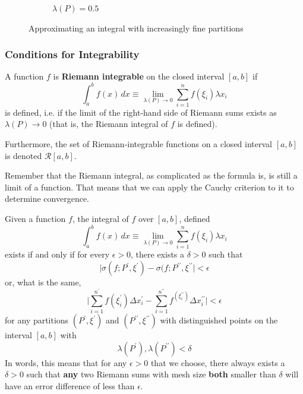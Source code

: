 \begin{definition}
\begin{figure}[H]
\begin{subfigure}[b]{0.32\textwidth}
        \caption{$\lambda(P) = 0.5$}
      \end{subfigure}
      \caption{Approximating an integral with increasingly fine partitions}
      \label{fig:partition-refinement}
    \end{figure}
  \end{definition}

\subsubsection{Conditions for Integrability}

  \begin{definition}
    A function $f$ is \textbf{Riemann integrable} on the closed interval $[a, b]$ if 
    \[\int_a^b f(x)\,dx \equiv \lim_{\lambda(P) \rightarrow 0} \sum_{i=1}^n f(\xi_i) \lambda x_i\]
    is defined, i.e. if the limit of the right-hand side of Riemann sums exists as $\lambda(P) \rightarrow 0$ (that is, the Riemann integral of $f$ is defined). 

    Furthermore, the set of Riemann-integrable functions on a closed interval $[a, b]$ is denoted $\mathcal{R}[a,b]$. 
  \end{definition}

  Remember that the Riemann integral, as complicated as the formula is, is still a limit of a function. That means that we can apply the Cauchy criterion to it to determine convergence. 

  \begin{lemma}
    Given a function $f$, the integral of $f$ over $[a, b]$, defined
    \[\int_a^b f(x)\,dx \equiv \lim_{\lambda(P) \rightarrow 0} \sum_{i=1}^n f(\xi_i) \lambda x_i\]
    exists if and only if for every $\epsilon>0$, there exists a $\delta>0$ such that 
    \[\big| \sigma(f; P^\prime, \xi^\prime) - \sigma(f; P^{\prime\prime}, \xi^{\prime\prime} \big| < \epsilon\]
    or, what is the same, 
    \[\Bigg| \sum_{i=1}^{n^\prime} f(\xi_i^\prime) \Delta x_i^\prime - \sum_{i=1}^{n^{\prime\prime}} f^(\xi_i^{\prime\prime}) \Delta x_i^{\prime\prime} \Bigg| < \epsilon\]
    for any partitions $(P^\prime, \xi^\prime)$ and $(P^{\prime\prime}, \xi^{\prime\prime})$ with distinguished points on the interval $[a, b]$ with
    \[\lambda(P^\prime), \lambda(P^{\prime\prime}) < \delta\]
    In words, this means that for any $\epsilon>0$ that we choose, there always exists a $\delta>0$ such that \textbf{any} two Riemann sums with mesh size \textbf{both} smaller than $\delta$ will have an error difference of less than $\epsilon$. 
  \end{lemma}


